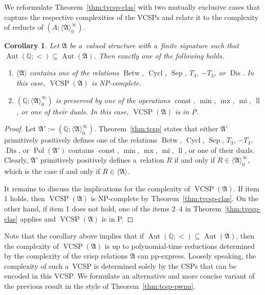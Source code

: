 \documentclass[preprint,12pt]{elsarticle}
\newcommand{\Q}{\mathbb Q}
\newcommand{\bA}{{\mathfrak A}}
\newcommand{\checked}[1]{#1}
\DeclareMathOperator{\Cyc}{Cycl}
\DeclareMathOperator{\Aut}{Aut}
\DeclareMathOperator{\VCSP}{VCSP}
\DeclareMathOperator{\Pol}{Pol}
\DeclareMathOperator{\mi}{mi}
\DeclareMathOperator{\lele}{ll}
\DeclareMathOperator{\mx}{mx}
\DeclareMathOperator{\const}{const}
\DeclareMathOperator{\Betw}{Betw}
\DeclareMathOperator{\Sep}{Sep}
\DeclareMathOperator{\Dis}{Dis}
\newtheorem{corollary}[theorem]{Corollary}
\begin{document}
We reformulate Theorem~\ref{thm:tvcsp-clas} with two mutually exclusive cases that capture the respective complexities of the VCSPs \checked{and relate it to the complexity of reducts of $(A; \langle \bA \rangle_0^\infty)$.}

\begin{corollary}\label{cor:tvcsp-clas}
Let $\bA$ be a~valued structure with a~finite signature such that $\Aut(\Q; <) \subseteq \Aut(\bA)$. Then exactly one of the following holds.
\begin{enumerate}
\item $\langle \bA \rangle$ contains one of the relations $\Betw$, $\Cyc$, $\Sep$, $T_3$, $-T_3$, or $\Dis$. In this case, $\VCSP(\bA)$ is NP-complete.
\item $(\Q; \langle \bA \rangle_0^\infty)$ is preserved by one of the operations $\const$, $\min$, $\mx$, $\mi$, $\lele$, or one of their duals. In this case, $\VCSP(\bA)$ is in P.
\end{enumerate}
\end{corollary}

\begin{proof}
Let $\bA':=(\Q; \langle \bA \rangle_0^\infty)$.
Theorem~\ref{thm:tcsp} states that either 
$\bA'$ primitively positively defines one of the relations $\Betw$, $\Cyc$, $\Sep$, $T_3$, $-T_3$, $\Dis$, or $\Pol(\bA')$ contains $\const$, $\min$, $\mx$, $\mi$, $\lele$, or one of their duals. Clearly, $\bA'$ primitively positively defines a~relation $R$ if and only if $R \in \langle \bA \rangle_0^\infty$, which is the case if and only if $R \in \langle \bA \rangle$.

It remains to discuss the implications for the complexity of $\VCSP(\bA)$. 
If item 1 holds, then $\VCSP(\bA)$ is NP-complete by Theorem~\ref{thm:tvcsp-clas}.
On the other hand, if item 1 does not hold, one of the items 2--4 in Theorem~\ref{thm:tvcsp-clas} applies and $\VCSP(\bA)$ is in P. 
\end{proof}

Note that the corollary above implies that if $\Aut(\Q; <) \subseteq \Aut(\bA)$, then the complexity of $\VCSP(\bA)$ is up to polynomial-time reductions determined by the complexity of the crisp relations $\bA$ can \checked{pp-}express. Loosely speaking, the complexity of such a~VCSP is determined solely by the CSPs that can be encoded in this VCSP. We formulate an alternative and more concise variant of the previous result in the style of Theorem~\ref{thm:tcsp-pwnu}.
\end{document}

